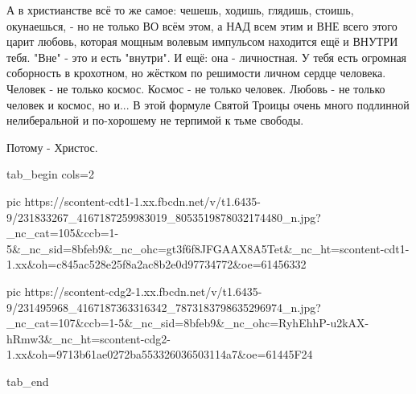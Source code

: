А в христианстве всё то же самое: чешешь, ходишь, глядишь, стоишь, окунаешься,
- но не только ВО всём этом, а НАД всем этим и ВНЕ всего этого царит любовь,
которая мощным волевым импульсом находится ещё и ВНУТРИ тебя. "Вне" - это и
есть "внутри". И ещё: она - личностная. У тебя есть огромная соборность в
крохотном, но жёстком по решимости личном сердце человека. Человек - не только
космос. Космос - не только человек. Любовь - не только человек и космос, но
и... В этой формуле Святой Троицы очень много подлинной нелиберальной и
по-хорошему не терпимой к тьме свободы.

Потому - Христос.


\ifcmt
  tab_begin cols=2

     pic https://scontent-cdt1-1.xx.fbcdn.net/v/t1.6435-9/231833267_4167187259983019_8053519878032174480_n.jpg?_nc_cat=105&ccb=1-5&_nc_sid=8bfeb9&_nc_ohc=gt3f6f8JFGAAX8A5Tet&_nc_ht=scontent-cdt1-1.xx&oh=c845ac528e25f8a2ac8b2e0d97734772&oe=61456332

     pic https://scontent-cdg2-1.xx.fbcdn.net/v/t1.6435-9/231495968_4167187363316342_7873183798635296974_n.jpg?_nc_cat=107&ccb=1-5&_nc_sid=8bfeb9&_nc_ohc=RyhEhhP-u2kAX-hRmw3&_nc_ht=scontent-cdg2-1.xx&oh=9713b61ae0272ba553326036503114a7&oe=61445F24

  tab_end
\fi


